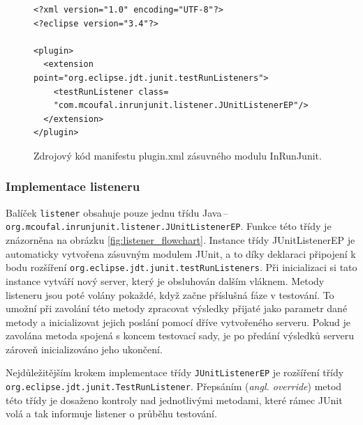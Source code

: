 	\lstset{language=xml}
	\begin{figure}
	  \begin{lstlisting}[frame=single]
<?xml version="1.0" encoding="UTF-8"?>
<?eclipse version="3.4"?>

<plugin>
  <extension point="org.eclipse.jdt.junit.testRunListeners">
    <testRunListener class=
    "com.mcoufal.inrunjunit.listener.JUnitListenerEP"/>
  </extension>
</plugin>
	  \end{lstlisting}
	  \caption{Zdrojový kód manifestu plugin.xml zásuvného modulu InRunJunit.}
	  \label{code:plugin.xml}
	\end{figure}
     
      \subsubsection{Implementace listeneru}
	Balíček \texttt{listener} obsahuje pouze jednu třídu Java\,--\,\texttt{org.\-mcoufal.\-inrunjunit.\-listener.\-JUnitListenerEP}. Funkce této třídy je znázorněna na obrázku \ref{fig:listener_flowchart}. Instance třídy JUnitListenerEP je automaticky vytvořena zásuvným modulem JUnit, a to díky deklaraci připojení k bodu rozšíření \texttt{org.\-eclipse.\-jdt.\-junit.\-testRunListeners}. Při inicializaci si tato instance vytváří nový server, který je obsluhován dalším vláknem. Metody listeneru jsou poté volány pokaždé, když začne příslušná fáze v testování. To umožní při zavolání této metody zpracovat výsledky přijaté jako parametr dané metody a inicializovat jejich poslání pomocí dříve vytvořeného serveru. Pokud je zavolána metoda spojená s koncem testovací sady, je po předání výsledků serveru zároveň inicializováno jeho ukončení.
	
	Nejdůležitějším krokem implementace třídy \texttt{JUnitListenerEP} je rozšíření třídy \texttt{org.\-eclipse.\-jdt.\-junit.\-TestRunListener}. Přepsáním (\emph{angl. override}) metod této třídy je dosaženo kontroly nad jednotlivými metodami, které rámec JUnit volá a tak informuje listener o průběhu testování.
	
